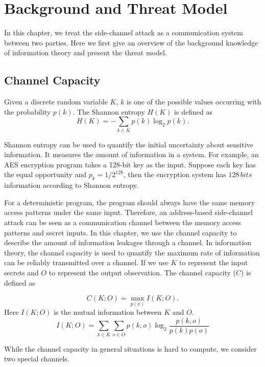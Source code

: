 \section{Background and Threat Model}
In this chapter, we treat the side-channel attack as a communication system between two parties.
Here we first give an overview of the background knowledge of information theory and present the threat model.


\subsection{Channel Capacity}
Given a discrete random variable $K$,
$k$ is one of the possible
values occurring with the probability $p(k)$. The Shannon entropy $H(K)$ is defined as
\begin{equation}\label{chapter5:eq1}
  H(K) = - \sum_{k {\in} K}p(k)\log_2p(k).
\end{equation}

Shannon entropy can be used to quantify the initial uncertainty about sensitive information. It measures the amount of information in a system. For example, an AES encryption program takes a 128-bit key as the input. Suppose each key has the equal opportunity and $p_k = 1/ 2^{128}$, then the encryption system has $128 \, \mathit{bits}$ information according to Shannon entropy.

For a deterministic program, the program should always have the same memory access patterns under the same input. Therefore, an address-based side-channel attack can be seen as a communication channel between the memory access patterns and secret inputs. In this chapter, we use the channel capacity to describe the amount of information leakages through a channel. In information theory, the channel capacity is used to quantify the maximum rate of information can be reliably transmitted over a channel. If we use $K$ to represent the input secrets and $O$ to represent the output observation. The channel capacity ($C$) is defined as

\begin{equation}\label{chapter5:eq2}
  C(K;O) = \max_{p(x)} I(K;O).
\end{equation}
Here $I(K;O)$ is the mutual information between $K$ and $O$.
\begin{equation} \label{chapter5:eq3}
  I(K;O) = \sum_{k {\in} K}{\sum_{o {\in} O}{p(k, o)\log_2\frac{p(k, o)}{p(k)p(o)}}}
\end{equation}

While the channel capacity in general situations is hard to compute, we consider two special channels.

